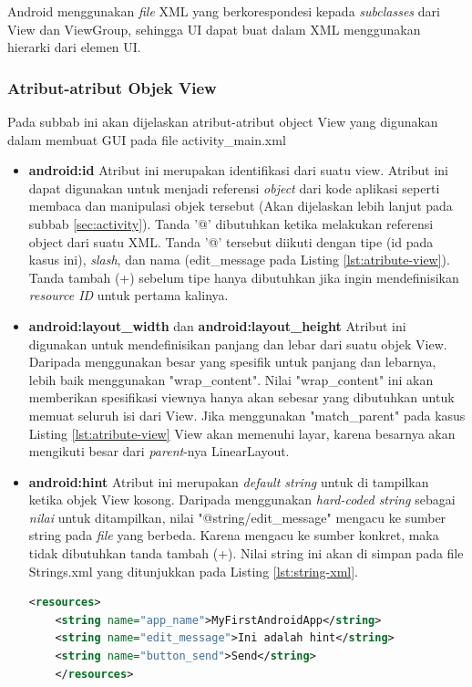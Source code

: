 Android menggunakan \textit{file} XML yang berkorespondesi kepada \textit{subclasses} dari View dan ViewGroup, sehingga UI dapat buat dalam XML menggunakan hierarki dari elemen UI.

\subsubsection{Atribut-atribut Objek View}
\label{sssec:atribut_atribut_objek_view}
Pada subbab ini akan dijelaskan atribut-atribut object View yang digunakan dalam membuat GUI pada file activity\_main.xml
\begin{itemize}
	\item \textbf{android:id}
	Atribut ini merupakan identifikasi dari suatu view. Atribut ini dapat digunakan untuk menjadi referensi \textit{object} dari kode aplikasi seperti membaca dan manipulasi objek tersebut (Akan dijelaskan lebih lanjut pada subbab \ref{sec:activity}). Tanda '@' dibutuhkan ketika melakukan referensi object dari suatu XML. Tanda '@' tersebut diikuti dengan tipe (id pada kasus ini), \textit{slash}, dan nama (edit\_message pada Listing \ref{lst:atribute-view}). Tanda tambah (+) sebelum tipe hanya dibutuhkan jika ingin mendefinisikan \textit{resource ID} untuk pertama kalinya.
	\item \textbf{android:layout\_width} dan \textbf{android:layout\_height}
	Atribut ini digunakan untuk mendefinisikan panjang dan lebar dari suatu objek View. Daripada menggunakan besar yang spesifik untuk panjang dan lebarnya, lebih baik menggunakan "wrap\_content". Nilai "wrap\_content" ini akan memberikan spesifikasi viewnya hanya akan sebesar yang dibutuhkan untuk memuat seluruh isi dari View. Jika menggunakan "match\_parent" pada kasus Listing \ref{lst:atribute-view} View akan memenuhi layar, karena besarnya akan mengikuti besar dari \textit{parent}-nya LinearLayout.

	\item \textbf{android:hint}
	Atribut ini merupakan \textit{default string} untuk di tampilkan ketika objek View kosong. Daripada menggunakan \textit{hard-coded string} sebagai \textit{nilai} untuk ditampilkan, nilai "@string/edit\_message" mengacu ke sumber string pada \textit{file} yang berbeda. Karena mengacu ke sumber konkret, maka tidak dibutuhkan tanda tambah (+). Nilai string ini akan di simpan pada file Strings.xml yang ditunjukkan pada Listing \ref{lst:string-xml}.
	\begin{lstlisting}[caption={Contoh kode pada string.xml},label={lst:string-xml},language=xml]
	<resources>
    <string name="app_name">MyFirstAndroidApp</string>
    <string name="edit_message">Ini adalah hint</string>
    <string name="button_send">Send</string>
	</resources>


\end{lstlisting}
\end{itemize}
